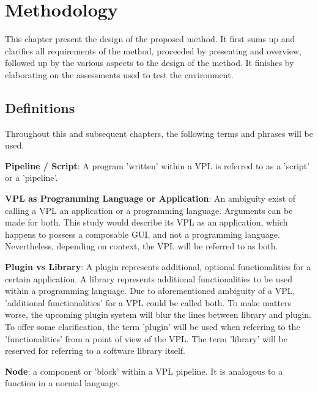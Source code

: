 \chapter{Methodology}
\label{chap:methodology}

This chapter present the design of the proposed method. 
It first sums up and clarifies all requirements of the method, proceeded by presenting and overview, followed up by the various aspects to the design of the method. 
It finishes by elaborating on the assessments used to test the environment. 

\section{Definitions}

Throughout this and subsequent chapters, the following terms and phrases will be used.

\textbf{Pipeline / Script}: A program 'written' within a VPL is referred to as a 'script' or a 'pipeline'.

\textbf{VPL as Programming Language or Application}: An ambiguity exist of calling a VPL an application or a programming language. 
Arguments can be made for both. 
This study would describe its VPL as an application, which happens to possess a composable \ac{GUI}, and not a programming language.
Nevertheless, depending on context, the VPL will be referred to as both.

\textbf{Plugin vs Library}: A plugin represents additional, optional functionalities for a certain application.
A library represents additional functionalities to be used within a programming language. 
Due to aforementioned ambiguity of a VPL, 'additional functionalities' for a VPL could be called both. 
To make matters worse, the upcoming plugin system will blur the lines between library and plugin. 
To offer some clarification, the term 'plugin' will be used when referring to the 'functionalities' from a point of view of the VPL.
The term 'library' will be reserved for referring to a software library itself. 

\textbf{Node}: a component or 'block' within a VPL pipeline. It is analogous to a function in a normal language.

